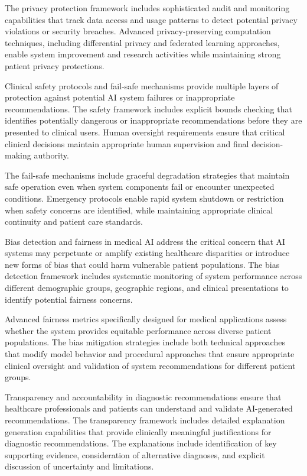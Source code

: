 The privacy protection framework includes sophisticated audit and monitoring capabilities that track data access and usage patterns to detect potential privacy violations or security breaches. Advanced privacy-preserving computation techniques, including differential privacy and federated learning approaches, enable system improvement and research activities while maintaining strong patient privacy protections.

Clinical safety protocols and fail-safe mechanisms provide multiple layers of protection against potential AI system failures or inappropriate recommendations. The safety framework includes explicit bounds checking that identifies potentially dangerous or inappropriate recommendations before they are presented to clinical users. Human oversight requirements ensure that critical clinical decisions maintain appropriate human supervision and final decision-making authority.

The fail-safe mechanisms include graceful degradation strategies that maintain safe operation even when system components fail or encounter unexpected conditions. Emergency protocols enable rapid system shutdown or restriction when safety concerns are identified, while maintaining appropriate clinical continuity and patient care standards.

Bias detection and fairness in medical AI address the critical concern that AI systems may perpetuate or amplify existing healthcare disparities or introduce new forms of bias that could harm vulnerable patient populations. The bias detection framework includes systematic monitoring of system performance across different demographic groups, geographic regions, and clinical presentations to identify potential fairness concerns.

Advanced fairness metrics specifically designed for medical applications assess whether the system provides equitable performance across diverse patient populations. The bias mitigation strategies include both technical approaches that modify model behavior and procedural approaches that ensure appropriate clinical oversight and validation of system recommendations for different patient groups.

Transparency and accountability in diagnostic recommendations ensure that healthcare professionals and patients can understand and validate AI-generated recommendations. The transparency framework includes detailed explanation generation capabilities that provide clinically meaningful justifications for diagnostic recommendations. The explanations include identification of key supporting evidence, consideration of alternative diagnoses, and explicit discussion of uncertainty and limitations.

